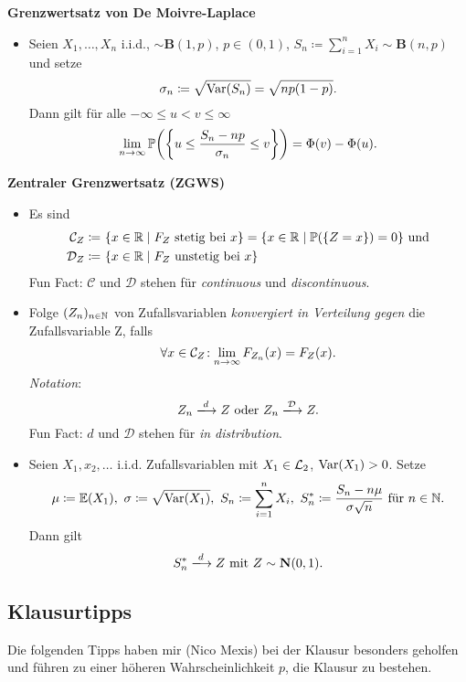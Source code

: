 \textbf{Grenzwertsatz von De Moivre-Laplace}
\begin{itemize}
	\item Seien $X_1,\ldots,X_n$ i.i.d., $\sim \textbf{B}(1,p)$, $p\in(0,1)$, $S_n\coloneqq\sum_{i=1}^n X_i\sim\textbf{B}(n,p)$ und setze
	\[
	  \sigma_n\coloneqq\sqrt{\operatorname{Var}(S_n)}=\sqrt{np(1-p)}.
	\]
	Dann gilt für alle $-\infty\leq u<v\leq\infty$
	\[
	  \limfty{n} \Pr\left(\left\{u\leq\frac{S_n-np}{\sigma_n}\leq v\right\}\right)=\Phi(v)-\Phi(u).
	\]
\end{itemize}

\textbf{Zentraler Grenzwertsatz (ZGWS)}
\begin{itemize}
	\item Es sind
	\begin{align*}
	  \mathcal{C}_Z\coloneqq\ &\{x\in\R\mid F_Z\ \text{stetig bei}\ x\}=\{x\in\R\mid \Pr(\{Z=x\})=0\}\ \text{und}\\
	  \mathcal{D}_Z\coloneqq\ &\{x\in\R\mid F_Z\ \text{unstetig bei}\ x\}
	\end{align*}
    Fun Fact: $\mathcal{C}$ und $\mathcal{D}$ stehen für \emph{continuous} und \emph{discontinuous}.
	
	\item Folge $(Z_n)_{n\in\mathbb{N}}$ von Zufallsvariablen \emph{konvergiert in Verteilung gegen} die Zufallsvariable Z, falls
	\[
	  \forall x\in\mathcal{C}_Z\!:\lim\limits_{n\to\infty} F_{Z_n}(x)=F_Z(x).
	\]
	\emph{Notation}:
	\[
	  Z_n\xlongrightarrow{d}Z\ \text{oder}\ Z_n\xlongrightarrow{\mathcal{D}}Z.
	\]
	Fun Fact: $d$ und $\mathcal{D}$ stehen für \emph{in distribution}.

	\item Seien $X_1,x_2,\ldots$ i.i.d. Zufallsvariablen mit $X_1\in\mathcal{L}_2$, $\operatorname{Var}(X_1)>0$. Setze
	\[
	  \mu\coloneqq\E(X_1),\ \sigma\coloneqq\sqrt{\Var(X_1)},\ S_n\coloneqq\sum_{i=1}^n X_i,\ S_n^*\coloneqq \frac{S_n-n\mu}{\sigma\sqrt{n}}\ \text{für}\ n\in\N.
	\]
	Dann gilt
	\[
	  S_n^*\xlongrightarrow{d} Z\ \text{mit}\ Z\sim\textbf{N}(0,1).
	\]
\end{itemize}

\newpage
\subsection{Klausurtipps}

Die folgenden Tipps haben mir (Nico Mexis) bei der Klausur besonders geholfen und führen zu einer höheren Wahrscheinlichkeit $p$, die Klausur zu bestehen.

